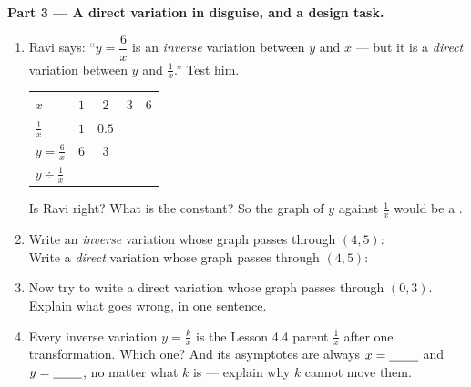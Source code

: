 \documentclass[10pt]{article}
\begin{document}
\begin{tcolorbox}[colback=white, colframe=black!40, title=\textbf{Tier E --- Extension},
    fonttitle=\bfseries, arc=1.5mm, left=3mm, right=3mm, top=2mm, bottom=2mm, breakable]
\vspace{5pt}
\textbf{Part 3 --- A direct variation in disguise, and a design task.}
\begin{enumerate}[label=(\alph*), leftmargin=2.1em, itemsep=5pt]
  \item Ravi says: ``$y=\dfrac{6}{x}$ is an \emph{inverse} variation between $y$ and $x$ --- but it is
        a \emph{direct} variation between $y$ and $\frac1x$.'' Test him.
        \begin{center}
        \renewcommand{\arraystretch}{1.3}
        \begin{tabular}{|l|c|c|c|c|}
        \hline
        \rowcolor{forestbg}
        $x$ & $1$ & $2$ & $3$ & $6$ \\ \hline
        $\frac1x$ & $1$ & $0.5$ & & \\ \hline
        $y=\frac6x$ & $6$ & $3$ & & \\ \hline
        $y\div\frac1x$ & & & & \\ \hline
        \end{tabular}
        \end{center}
        \vspace{-2pt}
        Is Ravi right? \blank{1.2cm} \; What is the constant? \blank{1.2cm} \; So the graph of $y$
        against $\frac1x$ would be a \blank{3.0cm}.
  \item Write an \emph{inverse} variation whose graph passes through $(4,5)$: \blank{3.0cm} \\
        Write a \emph{direct} variation whose graph passes through $(4,5)$: \blank{3.0cm}
  \item Now try to write a direct variation whose graph passes through $(0,3)$. \blank{3.0cm} \\
        Explain what goes wrong, in one sentence. \writeline
  \item Every inverse variation $y=\frac kx$ is the Lesson 4.4 parent $\frac1x$ after one
        transformation. Which one? \blank{4.6cm} \; And its asymptotes are always
        $x=\blank{0.8cm}$ and $y=\blank{0.8cm}$, no matter what $k$ is --- explain why $k$ cannot
        move them. \writeline
\end{enumerate}
\end{tcolorbox}
\end{document}
